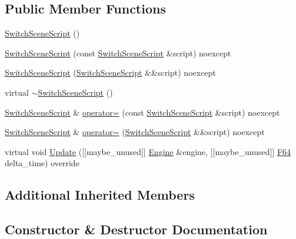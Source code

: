 \subsection*{Public Member Functions}
\begin{DoxyCompactItemize}
\item 
\hyperlink{classmage_1_1script_1_1_switch_scene_script_a7905bc08a81fbf2680e1b9e88a94988d}{Switch\+Scene\+Script} ()
\item 
\hyperlink{classmage_1_1script_1_1_switch_scene_script_af895d885db98e4b3ab7d3faca8fc8d8f}{Switch\+Scene\+Script} (const \hyperlink{classmage_1_1script_1_1_switch_scene_script}{Switch\+Scene\+Script} \&script) noexcept
\item 
\hyperlink{classmage_1_1script_1_1_switch_scene_script_af48c004b9419d4e462b6820297ebebd8}{Switch\+Scene\+Script} (\hyperlink{classmage_1_1script_1_1_switch_scene_script}{Switch\+Scene\+Script} \&\&script) noexcept
\item 
virtual \hyperlink{classmage_1_1script_1_1_switch_scene_script_ae4a846ba55d7b0ddb3730997ae162ba3}{$\sim$\+Switch\+Scene\+Script} ()
\item 
\hyperlink{classmage_1_1script_1_1_switch_scene_script}{Switch\+Scene\+Script} \& \hyperlink{classmage_1_1script_1_1_switch_scene_script_afb9ad12163066a2d801e0fdd0065303f}{operator=} (const \hyperlink{classmage_1_1script_1_1_switch_scene_script}{Switch\+Scene\+Script} \&script) noexcept
\item 
\hyperlink{classmage_1_1script_1_1_switch_scene_script}{Switch\+Scene\+Script} \& \hyperlink{classmage_1_1script_1_1_switch_scene_script_a59d77732c9ab91807f30af81accda316}{operator=} (\hyperlink{classmage_1_1script_1_1_switch_scene_script}{Switch\+Scene\+Script} \&\&script) noexcept
\item 
virtual void \hyperlink{classmage_1_1script_1_1_switch_scene_script_a6238958364d1d1448de0700ae9415e07}{Update} (\mbox{[}\mbox{[}maybe\+\_\+unused\mbox{]}\mbox{]} \hyperlink{classmage_1_1_engine}{Engine} \&engine, \mbox{[}\mbox{[}maybe\+\_\+unused\mbox{]}\mbox{]} \hyperlink{namespacemage_ad26233bbec640deda836e572c1a23708}{F64} delta\+\_\+time) override
\end{DoxyCompactItemize}
\subsection*{Additional Inherited Members}


\subsection{Constructor \& Destructor Documentation}
\hypertarget{classmage_1_1script_1_1_switch_scene_script_a7905bc08a81fbf2680e1b9e88a94988d}{}\label{classmage_1_1script_1_1_switch_scene_script_a7905bc08a81fbf2680e1b9e88a94988d} 
